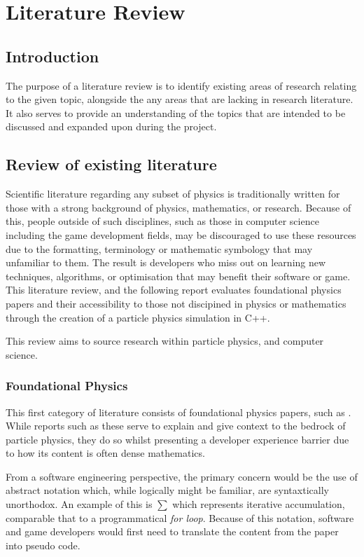 \chapter{Literature Review}

\section{Introduction}

The purpose of a literature review is to identify existing areas of research relating to the given topic, alongside the any areas that are lacking in
research literature. It also serves to provide an understanding of the topics that are intended to be discussed and expanded upon during the project.

\section{Review of existing literature}

Scientific literature regarding any subset of physics is traditionally written for those with a strong background of 
physics, mathematics, or research. Because of this, people outside of such disciplines, such as those in computer
science including the game development fields, may be discouraged to use these resources due to the formatting,
terminology or mathematic symbology that may unfamiliar to them. The result is developers who miss out on 
learning new techniques, algorithms, or optimisation that may benefit their software or game. This literature 
review, and the following report evaluates foundational physics papers and their accessibility to those not 
discipined in physics or mathematics through the creation of a particle physics simulation in C++. 

This review aims to source research within particle physics, and computer science.

\subsection{Foundational Physics}

This first category of literature consists of foundational physics papers, such as . While reports such as these serve to
explain and give context to the bedrock of particle physics, they do so whilst presenting a developer experience barrier due to how its content is often dense mathematics.

From a software engineering perspective, the primary concern would be the use of abstract notation which, while logically might be familiar, are syntaxtically unorthodox.
An example of this is $\sum$ which represents iterative accumulation, comparable that to a programmatical \textit{for loop}. Because of this notation, software
and game developers would first need to translate the content from the paper into pseudo code.

